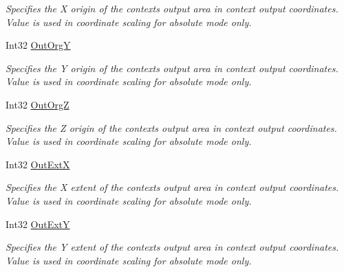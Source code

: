\begin{DoxyCompactItemize}
\begin{DoxyCompactList}\small\item\em Specifies the X origin of the context\textquotesingle{}s output area in context output coordinates. Value is used in coordinate scaling for absolute mode only. \end{DoxyCompactList}\item 
Int32 \mbox{\hyperlink{class_wintab_d_n_1_1_c_wintab_context_a5d27ca1711aa3f176519a1484936972b}{Out\+OrgY}}
\begin{DoxyCompactList}\small\item\em Specifies the Y origin of the context\textquotesingle{}s output area in context output coordinates. Value is used in coordinate scaling for absolute mode only. \end{DoxyCompactList}\item 
Int32 \mbox{\hyperlink{class_wintab_d_n_1_1_c_wintab_context_aee6840f04cc34b466e683d9892e82648}{Out\+OrgZ}}
\begin{DoxyCompactList}\small\item\em Specifies the Z origin of the context\textquotesingle{}s output area in context output coordinates. Value is used in coordinate scaling for absolute mode only. \end{DoxyCompactList}\item 
Int32 \mbox{\hyperlink{class_wintab_d_n_1_1_c_wintab_context_af911044cb67b004b35cca63883d598ae}{Out\+ExtX}}
\begin{DoxyCompactList}\small\item\em Specifies the X extent of the context\textquotesingle{}s output area in context output coordinates. Value is used in coordinate scaling for absolute mode only. \end{DoxyCompactList}\item 
Int32 \mbox{\hyperlink{class_wintab_d_n_1_1_c_wintab_context_aeb9155dbf8f387cfa2a38679b5af45a3}{Out\+ExtY}}
\begin{DoxyCompactList}\small\item\em Specifies the Y extent of the context\textquotesingle{}s output area in context output coordinates. Value is used in coordinate scaling for absolute mode only. \end{DoxyCompactList}\item 

\end{DoxyCompactItemize}
